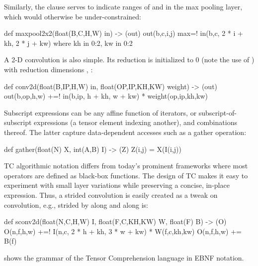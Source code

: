 Similarly, the  clause serves to indicate ranges of 
and  in the max pooling layer, which would otherwise be
under-constrained:
\begin{tclisting}
def maxpool2x2(float(B,C,H,W) in) -> (out)
  { out(b,c,i,j) max=! in(b,c, 2 * i + kh, 2 * j + kw) where kh in 0:2, kw in 0:2 }
\end{tclisting}
A 2-D convolution is also simple. Its reduction is initialized to $0$
(note the use of \ic{+=!}) with reduction dimensions , :
\label{page:conv2d}
\begin{tclisting}
def conv2d(float(B,IP,H,W) in, float(OP,IP,KH,KW) weight) -> (out)
  { out(b,op,h,w) +=! in(b,ip, h + kh, w + kw) * weight(op,ip,kh,kw) }
\end{tclisting}

Subscript expressions can be any affine function of iterators, or
subscript-of-subscript expressions (a tensor element indexing another),
and combinations thereof. The latter
capture data-dependent accesses such as a gather operation:
\begin{tclisting}
def gather(float(N) X, int(A,B) I) -> (Z) { Z(i,j) = X(I(i,j)) }
\end{tclisting}

TC algorithmic notation differs from today's prominent frameworks
where most operators are defined as black-box functions. The design of
TC makes it easy to experiment with small layer variations while
preserving a concise, in-place expression. Thus, a strided convolution
is easily created as a tweak on convolution, e.g., strided by 
along  and  along  is:
\begin{tclisting}
def sconv2d(float(N,C,H,W) I, float(F,C,KH,KW) W, float(F) B) -> (O) {
  O(n,f,h,w) +=! I(n,c, 2 * h + kh, 3 * w + kw) * W(f,c,kh,kw)
  O(n,f,h,w) +=  B(f)
}
\end{tclisting}

 shows the grammar of the Tensor Comprehension language in EBNF notation.

